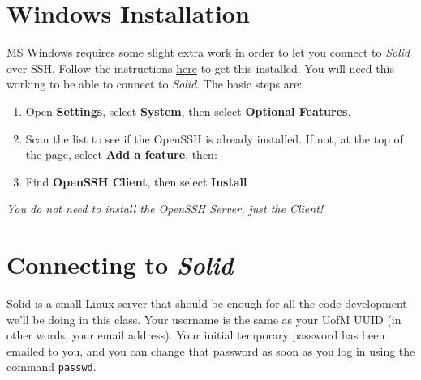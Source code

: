 \documentclass[11pt]{article}
\begin{document}
\section*{Windows Installation}
MS Windows requires some slight extra work in order to let you connect to \textit{Solid} over SSH.  Follow the 
instructions \href{https://learn.microsoft.com/en-gb/windows-server/administration/openssh/openssh_install_firstuse}{here}
to get this installed.  You will need this working to be able to connect to \textit{Solid}.  The basic steps are:

\begin{enumerate}
    \item Open \textbf{Settings}, select \textbf{System}, then select \textbf{Optional Features}.
    \item Scan the list to see if the OpenSSH is already installed. If not, at the top of the page, select \textbf{Add a feature}, then:
    \item Find \textbf{OpenSSH Client}, then select \textbf{Install}
\end{enumerate}

\textit{You do not need to install the OpenSSH Server, just the Client!}

\section*{Connecting to \textit{Solid}}
Solid is a small Linux server that should be enough for all the code development we'll be doing in this class.  Your username
is the same as your UofM UUID (in other words, your email address).  Your initial temporary password has been emailed to you, 
and you can change that password as soon as you log in using the command \texttt{passwd}.
\end{document}
